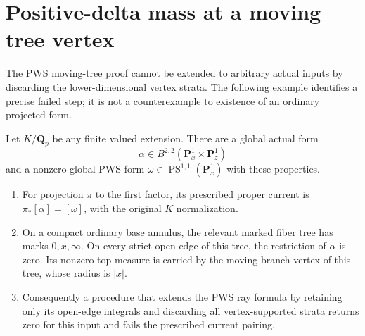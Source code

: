 \section{Positive-delta mass at a moving tree vertex}
\label{r15vg:section}

The PWS moving-tree proof cannot be extended to arbitrary actual
inputs by discarding the lower-dimensional vertex strata.  The
following example identifies a precise failed step; it is not a
counterexample to existence of an ordinary projected form.

\begin{proposition}
\label{r15vg:vertex}
Let $K/\mathbf Q_p$ be any finite valued extension.  There are a
global actual form
\[
 \alpha\in B^{2,2}(\mathbf P^1_x\times\mathbf P^1_z)
\]
and a nonzero global PWS form $\omega\in\operatorname{PS}^{1,1}
(\mathbf P^1_x)$ with these properties.
\begin{enumerate}
\item For projection $\pi$ to the first factor, its prescribed
proper current is $\pi_*[\alpha]=[\omega]$, with the original
$K$ normalization.
\item On a compact ordinary base annulus, the relevant marked
fiber tree has marks $0,x,\infty$.  On every strict open edge
of this tree, the restriction of $\alpha$ is zero.  Its nonzero
top measure is carried by the moving branch vertex of this
tree, whose radius is $|x|$.
\item Consequently a procedure that extends the PWS ray formula
by retaining only its open-edge integrals and discarding all
vertex-supported strata returns zero for this input and fails
the prescribed current pairing.
\end{enumerate}
\end{proposition}

